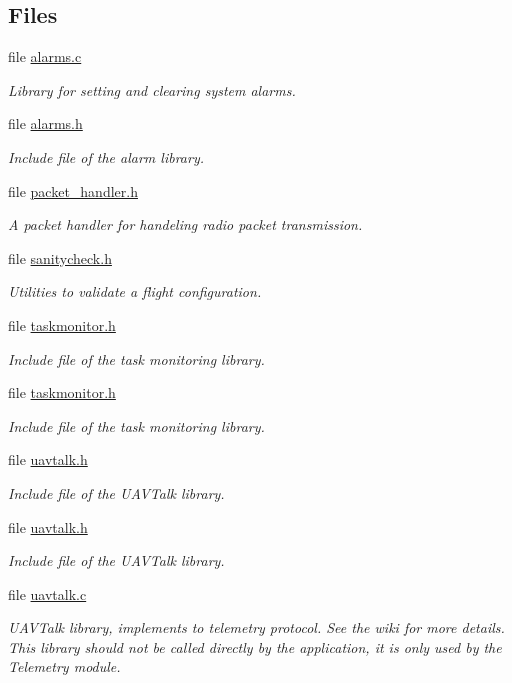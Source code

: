 \subsection*{Files}
\begin{DoxyCompactItemize}
\item 
file \hyperlink{alarms_8c}{alarms.\-c}
\begin{DoxyCompactList}\small\item\em Library for setting and clearing system alarms. \end{DoxyCompactList}\item 
file \hyperlink{alarms_8h}{alarms.\-h}
\begin{DoxyCompactList}\small\item\em Include file of the alarm library. \end{DoxyCompactList}\item 
file \hyperlink{packet__handler_8h}{packet\-\_\-handler.\-h}
\begin{DoxyCompactList}\small\item\em A packet handler for handeling radio packet transmission. \end{DoxyCompactList}\item 
file \hyperlink{sanitycheck_8h}{sanitycheck.\-h}
\begin{DoxyCompactList}\small\item\em Utilities to validate a flight configuration. \end{DoxyCompactList}\item 
file \hyperlink{taskmonitor_8h}{taskmonitor.\-h}
\begin{DoxyCompactList}\small\item\em Include file of the task monitoring library. \end{DoxyCompactList}\item 
file \hyperlink{taskmonitor_8h}{taskmonitor.\-h}
\begin{DoxyCompactList}\small\item\em Include file of the task monitoring library. \end{DoxyCompactList}\item 
file \hyperlink{uavtalk_8h}{uavtalk.\-h}
\begin{DoxyCompactList}\small\item\em Include file of the U\-A\-V\-Talk library. \end{DoxyCompactList}\item 
file \hyperlink{uavtalk_8h}{uavtalk.\-h}
\begin{DoxyCompactList}\small\item\em Include file of the U\-A\-V\-Talk library. \end{DoxyCompactList}\item 
file \hyperlink{uavtalk_8c}{uavtalk.\-c}
\begin{DoxyCompactList}\small\item\em U\-A\-V\-Talk library, implements to telemetry protocol. See the wiki for more details. This library should not be called directly by the application, it is only used by the Telemetry module. \end{DoxyCompactList}\end{DoxyCompactItemize}
